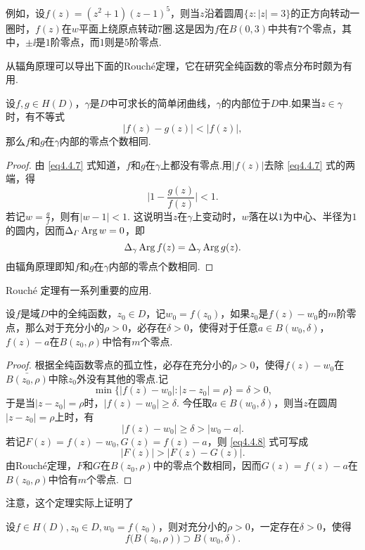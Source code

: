 例如，设$f(z)=(z^2+1)(z-1)^5$，则当$z$沿着圆周$\{z:|z|=3\}$的正方向转动一圈时，$f(z)$在$w$平面上绕原点转动$7$圈.这是因为$f$在$B(0,3)$中共有$7$个零点，其中，$\pm\ii$是$1$阶零点，而$1$则是$5$阶零点.

从辐角原理可以导出下面的Rouch\'e定理，它在研究全纯函数的零点分布时颇为有用. 
\begin{theorem}\label{thm4.4.3}
  设$f,g\in H(D)$，$\gamma$是$D$中可求长的简单闭曲线，$\gamma$的内部位于$D$中.如果当$z\in\gamma$时，有不等式
  \begin{equation}\label{eq4.4.7}
    |f(z) - g(z)| < |f(z)|,
  \end{equation}
  那么$f$和$g$在$\gamma$内部的零点个数相同.
\end{theorem}
\begin{proof}
  由 \eqref{eq4.4.7} 式知道，$f$和$g$在$\gamma$上都没有零点.用$|f(z)|$去除 \eqref{eq4.4.7} 式的两端，得
  \[
    \bigg|1 - \frac{g(z)}{f(z)} \bigg| < 1.
  \]
  若记$w=\frac gf$，则有$|w-1|<1$. 这说明当$z$在$\gamma$上变动时，$w$落在以$1$为中心、半径为$1$的圆内，因而$\Delta_\varGamma\operatorname{Arg} w=0$，即
  \[
    \Delta_\gamma\operatorname{Arg} f(z) = \Delta_\gamma\operatorname{Arg} g(z).
  \]
  由辐角原理即知$f$和$g$在$\gamma$内部的零点个数相同.
\end{proof}

Rouch\'e 定理有一系列重要的应用.
\begin{theorem}\label{thm4.4.4}
  设$f$是域$D$中的全纯函数，$z_0\in D$，记$w_0=f(z_0)$，如果$z_0$是$f(z)-w_0$的$m$阶零点，那么对于充分小的$\rho>0$，必存在$\delta>0$，使得对于任意$a\in B(w_0,\delta)$，$f(z)-a$在$B(z_0,\rho)$中恰有$m$个零点.
\end{theorem}
\begin{proof}
  根据全纯函数零点的孤立性，必存在充分小的$\rho>0$，使得$f(z)-w_0$在$\bar{B(z_0,\rho)}$中除$z_0$外没有其他的零点.记
  \[
    \min\{|f(z)-w_0|:|z-z_0| = \rho\} = \delta>0,
  \]
  于是当$|z-z_0|=\rho$时，$|f(z)-w_0|\ge\delta$. 今任取$a\in B(w_0,\delta)$，则当$z$在圆周$|z-z_0|=\rho$上时，有
  \begin{equation}\label{eq4.4.8}
    |f(z) - w_0| \ge \delta > |w_0 - a|.
  \end{equation}
  若记$F(z)=f(z)-w_0,G(z)=f(z)-a$，则 \eqref{eq4.4.8} 式可写成
  \[
    |F(z)| > |F(z) - G(z)|.
  \]
  由Rouch\'e定理，$F$和$G$在$B(z_0,\rho)$中的零点个数相同，因而$G(z)=f(z)-a$在$B(z_0,\rho)$中恰有$m$个零点.
\end{proof}

注意，这个定理实际上证明了
\begin{corollary}\label{cor4.4.5}
  设$f\in H(D),z_0\in D,w_0=f(z_0)$，则对充分小的$\rho>0$，一定存在$\delta>0$，使得
  \[
    f\big(B(z_0,\rho)\big) \supset B(w_0,\delta).
  \]
\end{corollary}


